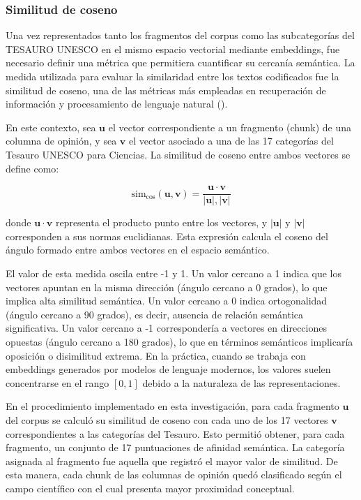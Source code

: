\documentclass[11pt,a4paper]{article}
\begin{document}
	
	\subsubsection{Similitud de coseno}
	
	Una vez representados tanto los fragmentos del corpus como las subcategorías del TESAURO UNESCO en el mismo espacio vectorial mediante embeddings, fue necesario definir una métrica que permitiera cuantificar su cercanía semántica. La medida utilizada para evaluar la similaridad entre los textos codificados fue la similitud de coseno, una de las métricas más empleadas en recuperación de información y procesamiento de lenguaje natural (\cite{Jurafsky2025}).
		
	En este contexto, sea $\mathbf{u}$ el vector correspondiente a un fragmento (chunk) de una columna de opinión, y sea $\mathbf{v}$ el vector asociado a una de las 17 categorías del Tesauro UNESCO para Ciencias. La similitud de coseno entre ambos vectores se define como:
		
	\begin{equation}
			\text{sim}_{\cos}(\mathbf{u}, \mathbf{v}) =
			\frac{\mathbf{u} \cdot \mathbf{v}}
			{|\mathbf{u}| , |\mathbf{v}|}
	\end{equation}
		
	donde $\mathbf{u} \cdot \mathbf{v}$ representa el producto punto entre los vectores, y $|\mathbf{u}|$ y $|\mathbf{v}|$ corresponden a sus normas euclidianas. Esta expresión calcula el coseno del ángulo formado entre ambos vectores en el espacio semántico.
		
	El valor de esta medida oscila entre -1 y 1. Un valor cercano a 1 indica que los vectores apuntan en la misma dirección (ángulo cercano a 0 grados), lo que implica alta similitud semántica. Un valor cercano a 0 indica ortogonalidad (ángulo cercano a 90 grados), es decir, ausencia de relación semántica significativa. Un valor cercano a -1 correspondería a vectores en direcciones opuestas (ángulo cercano a 180 grados), lo que en términos semánticos implicaría oposición o disimilitud extrema. En la práctica, cuando se trabaja con embeddings generados por modelos de lenguaje modernos, los valores suelen concentrarse en el rango $[0,1]$ debido a la naturaleza de las representaciones.
		
	En el procedimiento implementado en esta investigación, para cada fragmento $\mathbf{u}$ del corpus se calculó su similitud de coseno con cada uno de los 17 vectores $\mathbf{v}$ correspondientes a las categorías del Tesauro. Esto permitió obtener, para cada fragmento, un conjunto de 17 puntuaciones de afinidad semántica. La categoría asignada al fragmento fue aquella que registró el mayor valor de similitud. De esta manera, cada chunk de las columnas de opinión quedó clasificado según el campo científico con el cual presenta mayor proximidad conceptual.
	
\end{document}
